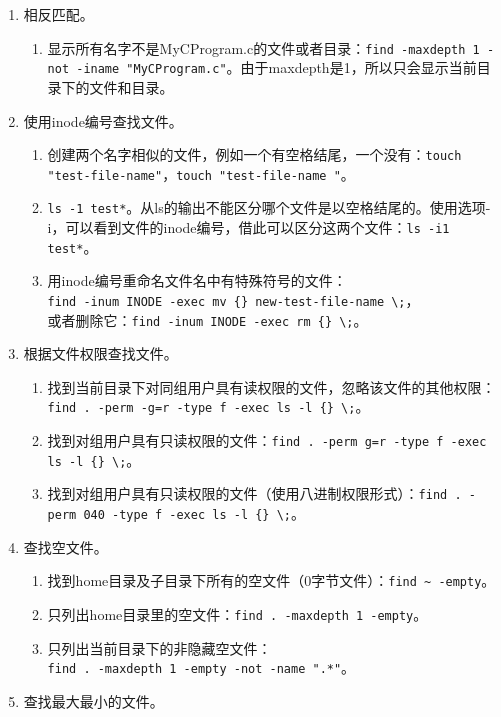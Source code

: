 \begin{enumerate}
  \item 相反匹配。
    \begin{enumerate}
      \item 显示所有名字不是MyCProgram.c的文件或者目录：\verb|find -maxdepth 1 -not -iname "MyCProgram.c"|。由于maxdepth是1，所以只会显示当前目录下的文件和目录。
    \end{enumerate}
  \item 使用inode编号查找文件。
    \begin{enumerate}
      \item 创建两个名字相似的文件，例如一个有空格结尾，一个没有：\verb|touch "test-file-name"|，\verb|touch "test-file-name "|。
      \item \verb|ls -1 test*|。从ls的输出不能区分哪个文件是以空格结尾的。使用选项-i，可以看到文件的inode编号，借此可以区分这两个文件：\verb|ls -i1 test*|。
      \item 用inode编号重命名文件名中有特殊符号的文件：\\ \verb|find -inum INODE -exec mv {} new-test-file-name \;|，\\ 或者删除它：\verb|find -inum INODE -exec rm {} \;|。
    \end{enumerate}
  \item 根据文件权限查找文件。
    \begin{enumerate}
      \item 找到当前目录下对同组用户具有读权限的文件，忽略该文件的其他权限：\verb|find . -perm -g=r -type f -exec ls -l {} \;|。
      \item 找到对组用户具有只读权限的文件：\verb|find . -perm g=r -type f -exec ls -l {} \;|。
      \item 找到对组用户具有只读权限的文件（使用八进制权限形式）：\verb|find . -perm 040 -type f -exec ls -l {} \;|。
    \end{enumerate}
  \item 查找空文件。
    \begin{enumerate}
      \item 找到home目录及子目录下所有的空文件（0字节文件）：\verb|find ~ -empty|。
      \item 只列出home目录里的空文件：\verb|find . -maxdepth 1 -empty|。
      \item 只列出当前目录下的非隐藏空文件：\\ \verb|find . -maxdepth 1 -empty -not -name ".*"|。
    \end{enumerate}
  \item 查找最大最小的文件。
    \begin{enumerate}

\end{enumerate}
\end{enumerate}
